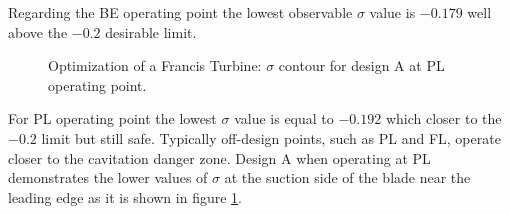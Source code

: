 Regarding the BE operating point the lowest observable $\sigma$ value is $-0.179$ well above the $-0.2$ desirable limit. 

\begin{figure}[h!]
\begin{minipage}[b]{1\linewidth}
 \centering
\end{minipage}
\caption{Optimization of a Francis Turbine: $\sigma$ contour for design A at PL operating point.}
\label{Francis-A-PL}
\end{figure}

For PL operating point the lowest $\sigma$ value is equal to $-0.192$ which closer to the $-0.2$ limit but still safe. Typically off-design points, such as PL and FL, operate closer to the cavitation danger zone. Design A when operating at PL demonstrates the lower values of $\sigma$ at the suction side of the blade near the leading edge as it is shown in figure \ref{Francis-A-PL}.  
 

